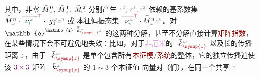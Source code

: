 其中，非零 $\bar{\bar{M}}_{\mathcolor{gray}{\omega}}^{\;\! 0}$, $\bar{\bar{M}}_{\mathcolor{gray}{\omega}}^{\;\! 1}$, $\bar{\bar{M}}_{\mathcolor{gray}{\omega}}^{\;\! 2}$ 分别产生 $\mathcolor{gray}{z^0}, \mathcolor{gray}{z^1}, \mathcolor{gray}{z^2}$ 依赖的\textcolor{PineGreen}{基系数集} $\bar{\bar{M}}_{\mathcolor{gray}{\omega}}^{\;\! n} \cdot \overline{\Xint{\begin{smallmatrix} ~ \\ {}^{}_{\mathcolor{gray}{-}} \\ ~ \end{smallmatrix}}{15}{\bar{\nu}}^{\;\!\mathcolor{gray}{\omega}}_{\textcolor{PineGreen}{l}}}^{-{{\mathsf{\textcolor{Plum}{T}}}}} \cdot \Xint{{}^{}_{\mathcolor{gray}{-}}}{10}{\bar{g}}^{\;\!\mathcolor{gray}{\omega}}_0 \mathcolor{gray}{z^n}$ 或 \textcolor{PineGreen}{本征偏振态集} $\overline{\Xint{\begin{smallmatrix} ~ \\ {}^{}_{\mathcolor{gray}{-}} \\ ~ \end{smallmatrix}}{15}{\bar{\nu}}^{\;\!\mathcolor{gray}{\omega}}_{\textcolor{PineGreen}{\imath}}}^{\mathsf{\textcolor{Plum}{T}}} \cdot \bar{\bar{M}}_{\mathcolor{gray}{\omega}}^{\;\! n} \mathcolor{gray}{z^n}$。对 $\mathbb{e}^{\mathbb{i} \Xint{\begin{smallmatrix} ~ \\ {}^{}_{\mathcolor{gray}{-}} \\ ~ \end{smallmatrix}}{15}{\bar{\bar{k}}}_{\textcolor{Maroon}{\symup{z}}}^{\;\! \mathcolor{gray}{\omega}} \mathcolor{gray}{z}}$ 的这两种分解，甚至不分解直接计算\textcolor{Maroon}{矩阵指数}，在某些情况下会不可避免地失效：比如，对于\textcolor{Plum}{非厄米}的 $\Xint{\begin{smallmatrix} ~ \\ {}^{}_{\mathcolor{gray}{-}} \\ ~ \end{smallmatrix}}{15}{\bar{\bar{k}}}_{\textcolor{Maroon}{\symup{z}}}^{\;\! \mathcolor{gray}{\omega}}$ 以及长的\textcolor{NavyBlue}{传播距离} $\mathcolor{gray}{z}$，由于 $\Xint{\begin{smallmatrix} ~ \\ {}^{}_{\mathcolor{gray}{-}} \\ ~ \end{smallmatrix}}{15}{\bar{\bar{k}}}_{\textcolor{Maroon}{\symup{z}}}^{\;\! \mathcolor{gray}{\omega}}$ 是单个包含所有\textcolor{Maroon}{本征模}/\textcolor{Maroon}{系统}的整体，它的独立传播迫使该 $\textcolor{Plum}{3 \times 3}$ 矩阵 $\Xint{\begin{smallmatrix} ~ \\ {}^{}_{\mathcolor{gray}{-}} \\ ~ \end{smallmatrix}}{15}{\bar{\bar{k}}}_{\textcolor{Maroon}{\symup{z}}}^{\;\! \mathcolor{gray}{\omega}}$ 的 $1\sim3$ 个\textcolor{PineGreen}{本征值}-\textcolor{PineGreen}{向量}对（们），在同一个共享 $\mathcolor{gray}{z}$ 